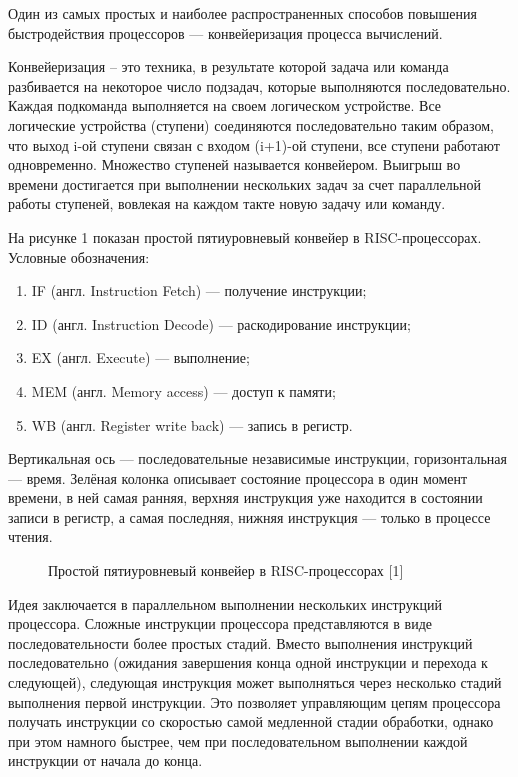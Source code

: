 \documentclass[a4paper,14pt]{report}
\begin{document}
Один из самых простых и наиболее распространенных способов повышения быстродействия процессоров — конвейеризация процесса вычислений.

Конвейеризация – это техника, в результате которой задача или  команда разбивается  на некоторое число подзадач, которые  выполняются последовательно.
Каждая  подкоманда   выполняется на своем логическом  устройстве.
Все логические устройства (ступени) соединяются последовательно таким образом, что выход i-ой  ступени  связан   с   входом   (i+1)-ой   ступени,  все ступени  работают  одновременно.
Множество  ступеней называется конвейером. Выигрыш во времени достигается при выполнении  нескольких задач  за  счет параллельной   работы   ступеней,  вовлекая  на  каждом такте новую задачу или команду.

На рисунке 1 показан простой пятиуровневый конвейер в RISC-процессорах. Условные обозначения:
\begin{enumerate}
	\item IF (англ. Instruction Fetch) — получение инструкции;
	\item ID (англ. Instruction Decode) — раскодирование инструкции;
	\item EX (англ. Execute) — выполнение;
	\item MEM (англ. Memory access) — доступ к памяти;
	\item WB (англ. Register write back) — запись в регистр.
\end{enumerate}

Вертикальная ось — последовательные независимые инструкции, горизонтальная — время. Зелёная колонка описывает состояние процессора в один момент времени, в ней самая ранняя, верхняя инструкция уже находится в состоянии записи в регистр, а самая последняя, нижняя инструкция — только в процессе чтения.

\begin{figure}
\caption{Простой пятиуровневый конвейер в RISC-процессорах [1]}
\label{fig:image}
\end{figure}

Идея заключается в параллельном выполнении нескольких инструкций процессора. Сложные инструкции процессора представляются в виде последовательности более простых стадий. Вместо выполнения инструкций последовательно (ожидания завершения конца одной инструкции и перехода к следующей), следующая инструкция может выполняться через несколько стадий выполнения первой инструкции. Это позволяет управляющим цепям процессора получать инструкции со скоростью самой медленной стадии обработки, однако при этом намного быстрее, чем при последовательном выполнении каждой инструкции от начала до конца.
\end{document}
